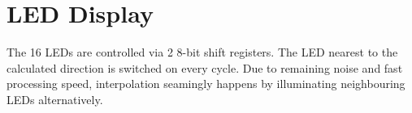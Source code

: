 \section{LED Display}
\label{sec::display}

The 16 LEDs are controlled via 2 8-bit shift registers.
The LED nearest to the calculated direction is switched on every cycle.
Due to remaining noise and fast processing speed, interpolation seamingly happens by illuminating neighbouring LEDs alternatively.